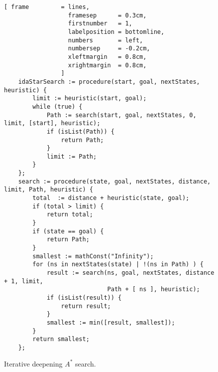 \begin{figure}[!ht]
\centering
\begin{Verbatim}[ frame         = lines, 
                  framesep      = 0.3cm, 
                  firstnumber   = 1,
                  labelposition = bottomline,
                  numbers       = left,
                  numbersep     = -0.2cm,
                  xleftmargin   = 0.8cm,
                  xrightmargin  = 0.8cm,
                ]
    idaStarSearch := procedure(start, goal, nextStates, heuristic) {
        limit := heuristic(start, goal);
        while (true) {
            Path := search(start, goal, nextStates, 0, limit, [start], heuristic);
            if (isList(Path)) {
                return Path;
            }
            limit := Path;
        }
    };
    search := procedure(state, goal, nextStates, distance, limit, Path, heuristic) {
        total  := distance + heuristic(state, goal);
        if (total > limit) {
            return total;
        }
        if (state == goal) {
            return Path;
        }
        smallest := mathConst("Infinity");  
        for (ns in nextStates(state) | !(ns in Path) ) {
            result := search(ns, goal, nextStates, distance + 1, limit, 
                             Path + [ ns ], heuristic);
            if (isList(result)) {
                return result;
            }
            smallest := min([result, smallest]);
        }
        return smallest;
    };
\end{Verbatim}
\vspace*{-0.3cm}
\caption{Iterative deepening $A^*$ search.}
\label{fig:iterative-deepening-a-star.stlx}
\end{figure}
